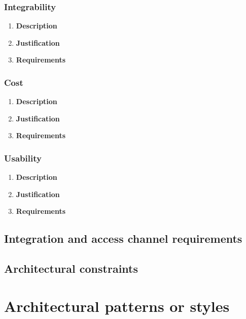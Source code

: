 \documentclass[a4paper,10pt]{article}
\begin{document}
	\subsubsection{Integrability}
		\begin{enumerate}
			\item \textbf{Description} \\
			\item \textbf{Justification} \\
			\item \textbf{Requirements}\\
		\end{enumerate}

	\subsubsection{Cost}
		\begin{enumerate}
			\item \textbf{Description} \\
			\item \textbf{Justification} \\
			\item \textbf{Requirements}\\
		\end{enumerate}

	\subsubsection{Usability}
		\begin{enumerate}
			\item \textbf{Description} \\
			\item \textbf{Justification} \\
			\item \textbf{Requirements}\\
		\end{enumerate}

\subsection{Integration and access channel requirements}
\subsection{Architectural constraints}

\section{Architectural patterns or styles}
\end{document}
